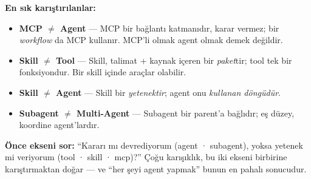 \vspace{4pt}
{\sffamily\bfseries\small\color{accentdk}En sık karıştırılanlar:}
\begin{itemize}
  \item \textbf{MCP $\neq$ Agent} --- MCP bir bağlantı katmanıdır, karar vermez; bir \emph{workflow} da MCP kullanır. MCP'li olmak agent olmak demek değildir.
  \item \textbf{Skill $\neq$ Tool} --- Skill, talimat + kaynak içeren bir \emph{paket}tir; tool tek bir fonksiyondur. Bir skill içinde araçlar olabilir.
  \item \textbf{Skill $\neq$ Agent} --- Skill bir \emph{yetenektir}; agent onu \emph{kullanan döngüdür}.
  \item \textbf{Subagent $\neq$ Multi-Agent} --- Subagent bir parent'a bağlıdır;  eş düzey, koordine agent'lardır.
\end{itemize}

\begin{principlebox}
\textbf{Önce ekseni sor:} ``Kararı mı devrediyorum (agent · subagent), yoksa yetenek
mi veriyorum (tool · skill · mcp)?'' Çoğu karışıklık, bu iki ekseni birbirine
karıştırmaktan doğar --- ve ``her şeyi agent yapmak'' bunun en pahalı sonucudur.
\end{principlebox}
